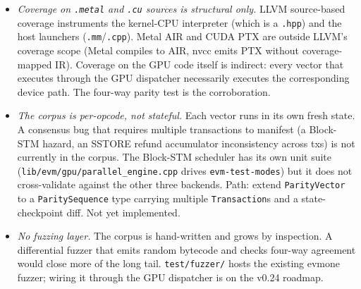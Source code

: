 \begin{itemize}
  \item \emph{Coverage on \texttt{.metal} and \texttt{.cu} sources is
    structural only.} LLVM source-based coverage instruments the
    kernel-CPU interpreter (which is a \texttt{.hpp}) and the host
    launchers (\texttt{.mm}/\texttt{.cpp}). Metal AIR and CUDA PTX are
    outside LLVM's coverage scope (Metal compiles to AIR, nvcc emits PTX
    without coverage-mapped IR). Coverage on the GPU code itself is
    indirect: every vector that executes through the GPU dispatcher
    necessarily executes the corresponding device path. The four-way
    parity test is the corroboration.
  \item \emph{The corpus is per-opcode, not stateful.} Each vector
    runs in its own fresh state. A consensus bug that requires multiple
    transactions to manifest (a Block-STM hazard, an SSTORE refund
    accumulator inconsistency across txs) is not currently in the corpus.
    The Block-STM scheduler has its own unit suite
    (\texttt{lib/evm/gpu/parallel\_engine.cpp} drives
    \texttt{evm-test-modes}) but it does not cross-validate against the
    other three backends. Path: extend \texttt{ParityVector} to a
    \texttt{ParitySequence} type carrying multiple \texttt{Transaction}s
    and a state-checkpoint diff. Not yet implemented.
  \item \emph{No fuzzing layer.} The corpus is hand-written and grows by
    inspection. A differential fuzzer that emits random bytecode and
    checks four-way agreement would close more of the long tail.
    \texttt{test/fuzzer/} hosts the existing evmone fuzzer; wiring it
    through the GPU dispatcher is on the v0.24 roadmap.
\end{itemize}

